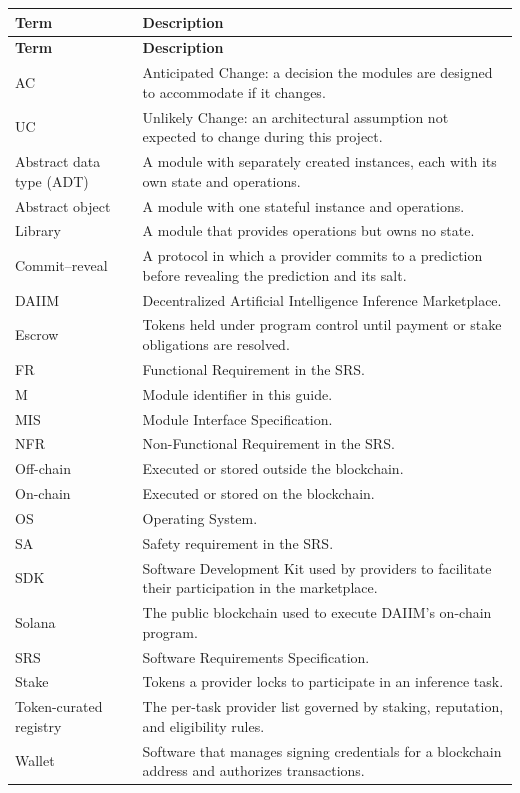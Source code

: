 \documentclass[12pt, titlepage]{article}
\begin{document}
\renewcommand{\arraystretch}{1.2}
\begin{longtable}{p{}p{}}
\toprule
\textbf{Term} & \textbf{Description}\\
\midrule
\endfirsthead
\toprule
\textbf{Term} & \textbf{Description}\\
\midrule
\endhead
AC & Anticipated Change: a decision the modules are designed to accommodate if it changes.\\
UC & Unlikely Change: an architectural assumption not expected to change during this project.\\
Abstract data type (ADT) & A module with separately created instances, each with its own state and operations.\\
Abstract object & A module with one stateful instance and operations.\\
Library & A module that provides operations but owns no state.\\
Commit--reveal & A protocol in which a provider commits to a prediction before revealing the prediction and its salt.\\
DAIIM & Decentralized Artificial Intelligence Inference Marketplace.\\
Escrow & Tokens held under program control until payment or stake obligations are resolved.\\
FR & Functional Requirement in the SRS.\\
M & Module identifier in this guide.\\
MIS & Module Interface Specification.\\
NFR & Non-Functional Requirement in the SRS.\\
Off-chain & Executed or stored outside the blockchain.\\
On-chain & Executed or stored on the blockchain.\\
OS & Operating System.\\
SA & Safety requirement in the SRS.\\
SDK & Software Development Kit used by providers to facilitate their participation in the marketplace.\\
Solana & The public blockchain used to execute DAIIM's on-chain program.\\
SRS & Software Requirements Specification.\\
Stake & Tokens a provider locks to participate in an inference task.\\
Token-curated registry & The per-task provider list governed by staking, reputation, and eligibility rules.\\
Wallet & Software that manages signing credentials for a blockchain address and authorizes transactions.\\
\bottomrule
\end{longtable}
\end{document}
